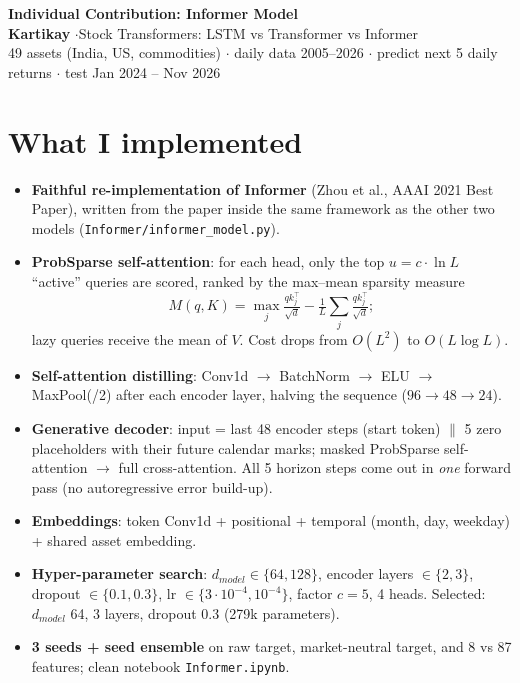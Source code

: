 \documentclass[10pt,a4paper]{article}
\begin{document}
\begin{center}
{\Large\bfseries Individual Contribution: Informer Model}\\[2pt]
\textbf{Kartikay} \quad$\cdot$\quad Stock Transformers: LSTM vs Transformer vs Informer\\[1pt]
\small 49 assets (India, US, commodities) $\cdot$ daily data 2005--2026 $\cdot$ predict next 5 daily returns $\cdot$ test Jan 2024 -- Nov 2026
\end{center}

\section{What I implemented}
\begin{itemize}
  \item \textbf{Faithful re-implementation of Informer} (Zhou et al., AAAI 2021 Best Paper), written from the paper inside the same framework as the other two models (\texttt{Informer/informer\_model.py}).
  \item \textbf{ProbSparse self-attention}: for each head, only the top $u=c\cdot\ln L$ ``active'' queries are scored, ranked by the max--mean sparsity measure \[M(q,K)=\max_j\tfrac{q k_j^\top}{\sqrt d}-\tfrac1L\textstyle\sum_j\tfrac{qk_j^\top}{\sqrt d};\] lazy queries receive the mean of $V$. Cost drops from $O(L^2)$ to $O(L\log L)$.
  \item \textbf{Self-attention distilling}: Conv1d $\to$ BatchNorm $\to$ ELU $\to$ MaxPool(/2) after each encoder layer, halving the sequence ($96\to48\to24$).
  \item \textbf{Generative decoder}: input = last 48 encoder steps (start token) $\|$ 5 zero placeholders with their future calendar marks; masked ProbSparse self-attention $\to$ full cross-attention. All 5 horizon steps come out in \emph{one} forward pass (no autoregressive error build-up).
  \item \textbf{Embeddings}: token Conv1d + positional + temporal (month, day, weekday) + shared asset embedding.
  \item \textbf{Hyper-parameter search}: $d_{model}\in\{64,128\}$, encoder layers $\in\{2,3\}$, dropout $\in\{0.1,0.3\}$, lr $\in\{3\cdot10^{-4},10^{-4}\}$, factor $c=5$, 4 heads. Selected: $d_{model}$ 64, 3 layers, dropout 0.3 (279k parameters).
  \item \textbf{3 seeds + seed ensemble} on raw target, market-neutral target, and 8 vs 87 features; clean notebook \texttt{Informer.ipynb}.
\end{itemize}
\end{document}
